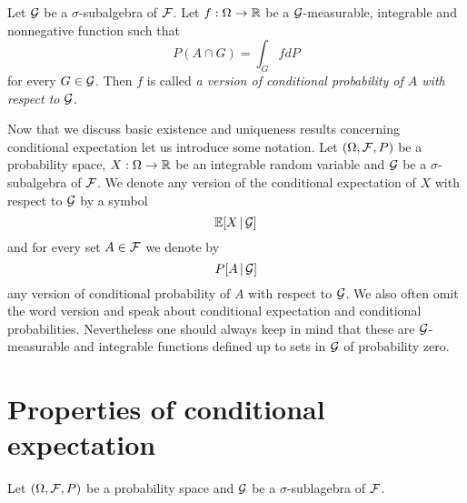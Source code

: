 \begin{definition}
Let ${\mathcal G}$ be a $\sigma$-subalgebra of ${\mathcal F}$. Let $f:\Omega \rightarrow {\mathbb R}$ be a ${\mathcal G}$-measurable, integrable and nonnegative function such that
$$P(A\cap G) = \int_G f dP$$
for every $G\in {\mathcal G}$. Then $f$ is called \textit{a version of conditional probability of $A$ with respect to ${\mathcal G}$}.
\end{definition}
\noindent
Now that we discuss basic existence and uniqueness results concerning conditional expectation let us introduce some notation. Let $(\Omega, {\mathcal F}, P)$ be a probability space, $X:\Omega \rightarrow {\mathbb R}$ be an integrable random variable and ${\mathcal G}$ be a $\sigma$-subalgebra of ${\mathcal F}$. We denote any version of the conditional expectation of $X$ with respect to ${\mathcal G}$ by a symbol
$$\mathbb{E}[X\,|\,{\mathcal G}]$$ 
and for every set $A\in {\mathcal F}$ we denote by
$$P[A\,|\,{\mathcal G}]$$
any version of conditional probability of $A$ with respect to ${\mathcal G}$. We also often omit the word version and speak about conditional expectation and conditional probabilities. Nevertheless one should always keep in mind that these are ${\mathcal G}$-measurable and integrable functions defined up to sets in ${\mathcal G}$ of probability zero.

\section{Properties of conditional expectation}
\noindent
Let $(\Omega, {\mathcal F}, P)$ be a probability space and ${\mathcal G}$ be a $\sigma$-sublagebra of ${\mathcal F}$.

